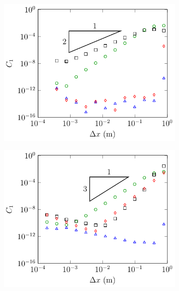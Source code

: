 \begin{figure}
\begin{subfigure}{0.5\textwidth}
		\vspace{0.5cm}
	\end{subfigure}
	\begin{subfigure}{0.5\textwidth}
		\includegraphics[width=\textwidth]{./chp5/figures/Analytic/Soliton/C1/FEVM2.pdf}
		\vspace{0.5cm}
	\end{subfigure}%
	\begin{subfigure}{0.5\textwidth}
		\includegraphics[width=\textwidth]{./chp5/figures/Analytic/Soliton/C1/FDVM3.pdf}

\end{subfigure}
\end{figure}
